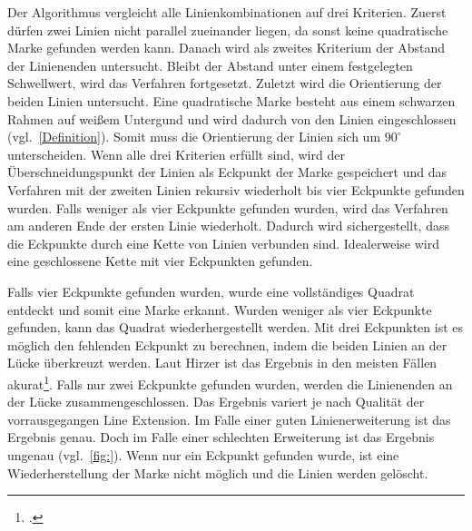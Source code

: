 Der Algorithmus vergleicht alle Linienkombinationen auf drei Kriterien. Zuerst dürfen zwei Linien nicht parallel
 zueinander liegen, da sonst keine quadratische Marke gefunden werden kann. Danach wird als zweites Kriterium der
 Abstand der Linienenden untersucht. Bleibt der Abstand unter einem festgelegten Schwellwert, wird das Verfahren
 fortgesetzt. Zuletzt wird die Orientierung der beiden Linien untersucht. Eine quadratische Marke besteht aus einem
 schwarzen Rahmen auf weißem Untergund und wird dadurch von den Linien eingeschlossen (vgl.~\autoref{Definition}).
 Somit muss die Orientierung der Linien sich um $90^\circ$ unterscheiden. Wenn alle drei Kriterien erfüllt sind, wird
 der Überschneidungspunkt der Linien als Eckpunkt der Marke gespeichert und das Verfahren mit der zweiten Linien
 rekursiv wiederholt bis vier Eckpunkte gefunden wurden. Falls weniger als vier Eckpunkte gefunden wurden, wird das
 Verfahren am anderen Ende der ersten Linie wiederholt. Dadurch wird sichergestellt, dass die Eckpunkte durch eine
 Kette von Linien verbunden sind. Idealerweise wird eine geschlossene Kette mit vier Eckpunkten gefunden.

Falls vier Eckpunkte gefunden wurden, wurde eine vollständiges Quadrat entdeckt und somit eine Marke erkannt. Wurden
 weniger als vier Eckpunkte gefunden, kann das Quadrat wiederhergestellt werden. Mit drei Eckpunkten ist es möglich den
 fehlenden Eckpunkt zu berechnen, indem die beiden Linien an der Lücke überkreuzt werden. Laut Hirzer ist das Ergebnis in
 den meisten Fällen akurat\footcite[Vgl.][S.15]{hirzer08}. Falls nur zwei Eckpunkte gefunden wurden, werden die
 Linienenden an der Lücke zusammengeschlossen. Das Ergebnis variert je nach Qualität der vorrausgegangen Line
 Extension. Im Falle einer guten Linienerweiterung ist das Ergebnis genau. Doch im Falle einer schlechten Erweiterung
 ist das Ergebnis ungenau (vgl.~\autoref{fig:}). Wenn nur ein Eckpunkt gefunden wurde, ist eine Wiederherstellung der
 Marke nicht möglich und die Linien werden gelöscht.


